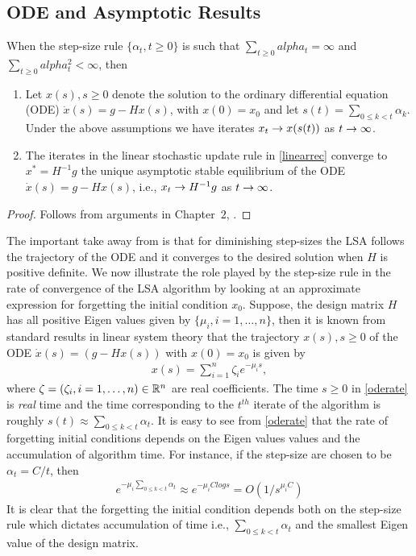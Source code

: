 \subsection{ODE and Asymptotic Results}
\begin{theorem}[Asymptotics]\label{linstab} When the step-size rule $\{\alpha_t,t\geq 0\}$ is such that $\sum_{t\geq 0} alpha_t =\infty$ and $\sum_{t\geq 0} alpha^2_t <\infty$, then
\begin{enumerate}[leftmargin=*] 
\item Let $x(s),s\geq 0$ denote the solution to the ordinary differential equation (ODE) $\dot{x}(s)=g-Hx(s)$, with $x(0)=x_0$ and let $s(t)=\sum_{0\leq k< t}\alpha_k$. Under the above assumptions we have iterates $x_t\rightarrow x(s(t))$ as $t\rightarrow\infty$.
\item The iterates in the linear stochastic update rule in \eqref{linearrec} converge to $x^*=H^{-1}g$ the unique asymptotic stable equilibrium of the ODE $\dot{x}(s)=g-Hx(s)$, i.e., $x_t\rightarrow H^{-1}g$ as $t\rightarrow\infty$.
\end{enumerate}
\end{theorem}
\begin{proof}
Follows from arguments in Chapter~$2$, \cite{borkarsa}.
\end{proof}
The important take away from  is that for diminishing step-sizes the LSA follows the trajectory of the ODE and it converges to the desired solution when $H$ is positive definite. We now illustrate the role played by the step-size rule in the rate of convergence of the LSA algorithm by looking at an approximate expression for forgetting the initial condition $x_0$. Suppose, the design matrix $H$ has all positive Eigen values given by $\{\mu_i,i=1,\ldots,n\}$, then it is known from standard results in linear system theory \cite{} that the trajectory $x(s),s\geq 0$ of the ODE $\dot{x}(s)=(g-Hx(s))$ with $x(0)=x_0$ is given by
\begin{align}\label{oderate}
x(s)=\sum_{i=1}^n \zeta_i e^{-\mu_i s}, 
\end{align}
where $\zeta=(\zeta_i,i=1,\ldots,n)\in \mathbb{R}^n$ are real coefficients. The time $s\geq 0$ in \eqref{oderate} is \emph{real} time and the time corresponding to the $t^{th}$ iterate of the algorithm is roughly $s(t)\approx\sum_{0\leq k<t}\alpha_t$. It is easy to see from \eqref{oderate} that the rate of forgetting initial conditions depends on the Eigen values values and the accumulation of algorithm time. For instance, if the step-size are chosen to be $\alpha_t=C/t$, then \begin{align}\label{biasforget}e^{-\mu_i\sum_{0\leq k<t}\alpha_t}\approx e^{-\mu_i Clog s}=O(1/s^{\mu_i C})\end{align}
It is clear that the forgetting the initial condition depends both on the step-size rule which dictates accumulation of time i.e., $\sum_{0\leq k<t}\alpha_t$ and the smallest Eigen value of the design matrix. 
